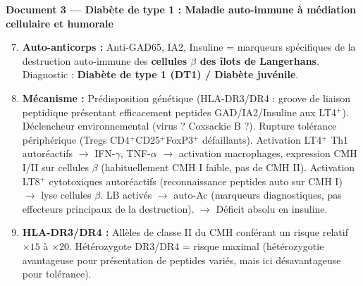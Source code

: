 \documentclass[11pt]{article}
\begin{document}
\begin{exoresolu}
\textbf{Document 3 — Diabète de type 1 : Maladie auto-immune à médiation cellulaire et humorale}
\begin{enumerate}
    \setcounter{enumi}{6}
    \item \textbf{Auto-anticorps :} Anti-GAD65, IA2, Insuline = marqueurs spécifiques de la destruction auto-immune des \textbf{cellules $\beta$ des îlots de Langerhans}. Diagnostic : \textbf{Diabète de type 1 (DT1) / Diabète juvénile}.
    \item \textbf{Mécanisme :} Prédisposition génétique (HLA-DR3/DR4 : groove de liaison peptidique présentant efficacement peptides GAD/IA2/Insuline aux LT4$^+$). Déclencheur environnemental (virus ? Coxsackie B ?). Rupture tolérance périphérique (Tregs CD4$^+$CD25$^+$FoxP3$^+$ défaillants). Activation LT4$^+$ Th1 autoréactifs $\rightarrow$ IFN-$\gamma$, TNF-$\alpha$ $\rightarrow$ activation macrophages, expression CMH I/II sur cellules $\beta$ (habituellement CMH I faible, pas de CMH II). Activation LT8$^+$ cytotoxiques autoréactifs (reconnaissance peptides auto sur CMH I) $\rightarrow$ lyse cellules $\beta$. LB activés $\rightarrow$ auto-Ac (marqueurs diagnostiques, pas effecteurs principaux de la destruction). $\rightarrow$ Déficit absolu en insuline.
    \item \textbf{HLA-DR3/DR4 :} Allèles de classe II du CMH conférant un risque relatif $\times 15$ à $\times 20$. Hétérozygote DR3/DR4 = risque maximal (hétérozygotie avantageuse pour présentation de peptides variés, mais ici désavantageuse pour tolérance).
\end{enumerate}


\end{exoresolu}
\end{document}
